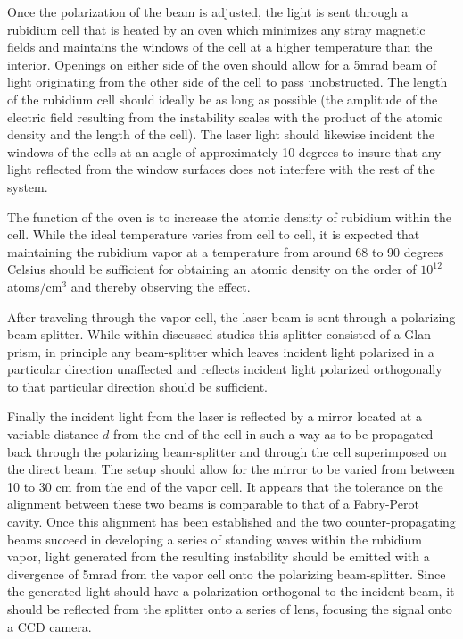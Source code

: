 \documentclass[aps,twocolumn,secnumarabic,balancelastpage,amsmath,amssymb,nofootinbib]{revtex4}
\begin{document}
Once the polarization of the beam is adjusted, the light is sent through a rubidium cell that is heated by an oven which minimizes any stray magnetic fields and maintains the windows of the cell at a higher temperature than the interior. Openings on either side of the oven should allow for a 5mrad beam of light originating from the other side of the cell to pass unobstructed. The length of the rubidium cell should ideally be as long as possible (the amplitude of the electric field resulting from the instability scales with the product of the atomic density and the length of the cell). The laser light should likewise incident the windows of the cells at an angle of approximately 10 degrees to insure that any light reflected from the window surfaces does not interfere with the rest of the system. 

The function of the oven is to increase the atomic density of rubidium within the cell. While the ideal temperature varies from cell to cell, it is expected that maintaining the rubidium vapor at a temperature from around 68 to 90 degrees Celsius should be sufficient for obtaining an atomic density on the order of $10^{12}$ atoms/cm$^3$ and thereby observing the effect.

After traveling through the vapor cell, the laser beam is sent through a polarizing beam-splitter. While within discussed studies this splitter consisted of a Glan prism\cite{grynberg93}, in principle any beam-splitter which leaves incident light polarized in a particular direction unaffected and reflects incident light polarized orthogonally to that particular direction should be sufficient.

Finally the incident light from the laser is reflected by a mirror located at a variable distance $d$ from the end of the cell in such a way as to be propagated back through the polarizing beam-splitter and through the cell superimposed on the direct beam. The setup should allow for the mirror to be varied from between 10 to 30 cm from the end of the vapor cell. It appears that the tolerance on the alignment between these two beams is comparable to that of a Fabry-Perot cavity. Once this alignment has been established and the two counter-propagating beams succeed in developing a series of standing waves within the rubidium vapor, light generated from the resulting instability should be emitted with a divergence of 5mrad from the vapor cell onto the polarizing beam-splitter. Since the generated light should have a polarization orthogonal to the incident beam, it should be reflected from the splitter onto a series of lens, focusing the signal onto a CCD camera.   
\end{document}
